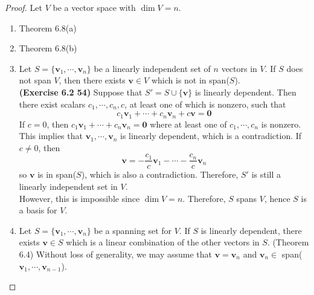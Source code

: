 \begin{proof}
	Let $V$ be a vector space with $\dim V = n$.
	\begin{enumerate}
		\item Theorem 6.8(a)
		\item Theorem 6.8(b)
		\item Let $S = \{ \textbf{v}_1, \cdots, \textbf{v}_n \}$ be a linearly independent set of $n$ vectors in $V$. If $S$ does not span $V$, then there exists $\textbf{v} \in V$ which is not in span($S$). \\
		
		\textbf{(Exercise 6.2 54)} Suppose that $S' = S \cup \{\textbf{v}\}$ is linearly dependent. Then there exist scalars $c_1, \cdots, c_n, c$, at least one of which is nonzero, such that \begin{equation*}
			c_1\textbf{v}_1 + \cdots + c_n\textbf{v}_n + c\textbf{v} = \textbf{0}
		\end{equation*} If $c = 0$, then $c_1\textbf{v}_1 + \cdots + c_n\textbf{v}_n = \textbf{0}$ where at least one of $c_1, \cdots, c_n$ is nonzero. This implies that $\textbf{v}_1, \cdots, \textbf{v}_n$ is linearly dependent, which is a contradiction. If $c \neq 0$, then \begin{equation*}
			\textbf{v} = -\frac{c_1}{c}\textbf{v}_1 - \cdots - \frac{c_n}{c}\textbf{v}_n
		\end{equation*} so $\textbf{v}$ is in span($S$), which is also a contradiction. Therefore, $S'$ is still a linearly independent set in $V$. \\
		
		However, this is impossible since $\dim V = n$. Therefore, $S$ spans $V$, hence $S$ is a basis for $V$.
		\item Let $S = \{\textbf{v}_1, \cdots, \textbf{v}_n \}$ be a spanning set for $V$. If $S$ is linearly dependent, there exists $\textbf{v} \in S$ which is a linear combination of the other vectors in $S$. (Theorem 6.4) Without loss of generality, we may assume that $\textbf{v} = \textbf{v}_n$ and $\textbf{v}_n \in$ span($\textbf{v}_1, \cdots, \textbf{v}_{n-1}$). \\
		

\end{enumerate}
\end{proof}
